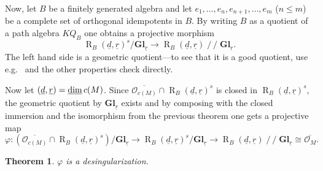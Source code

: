 \documentclass[11pt,a4paper]{amsart}
\theoremstyle{plain}
\newtheorem{thm}{Theorem}[section]
\theoremstyle{definition}
\begin{document}
Now, let $B$ be a finitely generated algebra and let $e_1, \ldots , e_n, e_{n+1}, \ldots , e_m$
($n\le m$) be a complete set of orthogonal idempotents in $B$.
By writing $B$ as a quotient of a path algebra $KQ_B$ one obtains a projective morphism 
\[ 
{\operatorname{R}_B(\underline{d},\underline{r})}^{s} / {\mathbf{Gl}_{\underline{r}}} \to {\operatorname{R}_B(\underline{d},\underline{r})} \operatorname{/\!\!/} {\mathbf{Gl}_{\underline{r}}}.
\]
The left hand side is a geometric quotient---to see that it is a good quotient, use e.g.\ \cite[Theorem 7.1.4]{BB} and the other properties check directly. 

Now let $({\underline{d}}, {\underline{r}}) =\operatorname{\rm \underline{dim}} c(M)$. Since $\overline{{\mathcal{O}}_{c(M)}}\cap {\operatorname{R}_B(\underline{d},\underline{r})}^{s}$ is closed in ${\operatorname{R}_B(\underline{d},\underline{r})}^{s}$, the geometric quotient by ${\mathbf{Gl}_{\underline{r}}}$ exists and by composing with the closed immersion and the isomorphism from the previous theorem one gets a projective map  
\[ 
\varphi\colon 
(\overline{{\mathcal{O}}_{c(M)}}\cap {\operatorname{R}_B(\underline{d},\underline{r})}^{s}) / {\mathbf{Gl}_{\underline{r}}} \to {\operatorname{R}_B(\underline{d},\underline{r})}^{s} / {\mathbf{Gl}_{\underline{r}}} 
\to {\operatorname{R}_B(\underline{d},\underline{r})} \operatorname{/\!\!/} {\mathbf{Gl}_{\underline{r}}} \cong \overline{{\mathcal{O}}_M}.  
\]

\begin{thm}\label{OrbDes}$\varphi$ is a desingularization. 
\end{thm}
\end{document}
